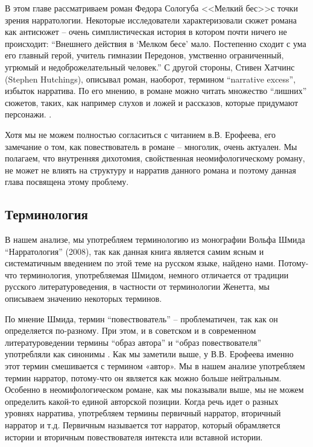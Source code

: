 \documentclass[12pt,a4paper]{article}
\begin{document}
В этом главе рассматриваем роман Федора Сологуба <<Мелкий бес>>с точки зрения нарратологии. Некоторые исследователи характеризовали сюжет романа как антисюжет -- очень симплистическая история в котором почти ничего не происходит: 
\enquote{Внешнего действия в \enquote{Мелком бесе} мало. Постепенно сходит с ума его главный герой, учитель гимназии Передонов, умственно ограниченный, угрюмый и недоброжелательный человек.}
\autocite[432.]{grigorjev1983} С другой стороны, Стивен Хатчинс (Stephen Hutchings), описывал роман, наоборот, термином \enquote{narrative excess}, избыток нарратива. По его мнению, в романе можно читать множество \enquote{лишних} сюжетов, таких, как например слухов и ложей и рассказов, которые придумают персонажи. \parencite[111--114]{hutchings1997}. 

Хотя мы не можем полностью согласиться с читанием в.В. Ерофеева, его замечание о том, как повествователь в романе – многолик, очень актуален. Мы полагаем, что внутренняя дихотомия, свойственная неомифологическому роману, не может не влиять на структуру и нарратив данного романа и поэтому данная глава посвящена этому проблему.


\subsection{Терминология}

В нашем анализе, мы употребляем терминологию из монографии Вольфа Шмида \enquote{Нарратология} (2008), так как данная книга является самим ясным и систематичным введением по этой теме на русском языке, найдено нами. Потому-что терминология, употребляемая Шмидом, немного отличается от традиции русского литературоведения, в частности от терминологии Женетта, мы описываем значению некоторых терминов.
  
По мнение Шмида, термин \enquote{повествователь} -- проблематичен, так как он
определяется по-разному. При этом, и в советском и в современном
литературоведении термины \enquote{образ автора} и \enquote{образ повествователя} употребляли как
синонимы \parencite[67--68]{schmid2008}.  Как мы заметили выше, у В.В.
Ерофеева именно этот термин смешивается с термином «автор». Мы в нашем анализе
употребляем термин нарратор, потому-что он является как можно больше
нейтральным. Особенно в неомифологическом романе, как мы показывали выше, мы не можем определить какой-то единой авторской позиции.  Когда речь идет о разных уровнях нарратива, употребляем термины
первичный нарратор, вторичный нарратор и т.д. Первичным называется тот нарратор,
который  обрамляется истории и вторичным повествователя интекста или вставной истории.
\end{document}
